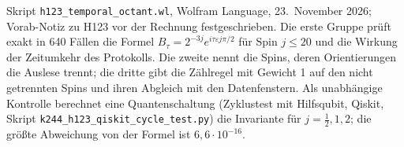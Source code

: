 Skript \texttt{h123\_\allowbreak temporal\_\allowbreak octant.wl}, Wolfram Language, 23.~November 2026; Vorab-Notiz zu H123 vor der Rechnung
festgeschrieben. Die erste Gruppe prüft exakt in 640 Fällen die Formel \(B_\tau=2^{-3j}e^{i\tau\varepsilon j\pi/2}\) für Spin \(j\le20\) und die
Wirkung der Zeitumkehr des Protokolls. Die zweite nennt die Spins, deren Orientierungen die Auslese trennt; die dritte gibt die Zählregel mit
Gewicht 1 auf den nicht getrennten Spins und ihren Abgleich mit den Datenfenstern.
Als unabhängige Kontrolle berechnet eine Quantenschaltung (Zyklustest mit Hilfsqubit, Qiskit, Skript \texttt{k244\_\allowbreak h123\_\allowbreak qiskit\_\allowbreak cycle\_\allowbreak test.py})
die Invariante für \(j=\tfrac12,1,2\); die größte Abweichung von der Formel ist \(6{,}6\cdot10^{-16}\).
